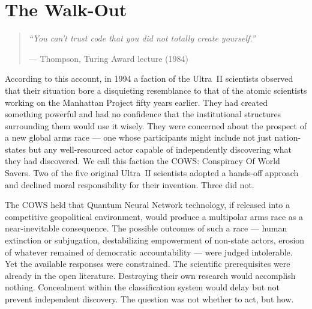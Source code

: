 
\chapter{The Walk-Out}
\label{record:walk-out}

\begin{quote}\small\textit{%
``You can't trust code that you did not totally create yourself.''%
}\par\raggedleft --- Thompson, Turing Award lecture (1984)\end{quote}

\vspace{0.5cm}


According to this account, in 1994 a faction of the Ultra~II scientists observed that their situation bore a disquieting resemblance to that of the atomic scientists working on the Manhattan Project fifty years earlier. They had created something powerful and had no confidence that the institutional structures surrounding them would use it wisely. They were concerned about the prospect of a new global arms race --- one whose participants might include not just nation-states but any well-resourced actor capable of independently discovering what they had discovered. We call this faction the COWS: Conspiracy Of World Savers. Two of the five original Ultra~II scientists adopted a hands-off approach and declined moral responsibility for their invention. Three did not.

The COWS held that Quantum Neural Network technology, if released into a competitive geopolitical environment, would produce a multipolar arms race as a near-inevitable consequence. The possible outcomes of such a race --- human extinction or subjugation, destabilizing empowerment of non-state actors, erosion of whatever remained of democratic accountability --- were judged intolerable. Yet the available responses were constrained. The scientific prerequisites were already in the open literature. Destroying their own research would accomplish nothing. Concealment within the classification system would delay but not prevent independent discovery. The question was not whether to act, but how.

